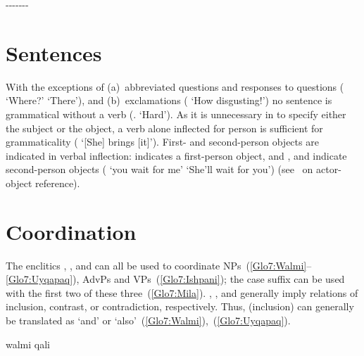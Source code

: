 \ea
\upshape 
{}-------

\z
 

\section{Sentences}\label{sec:sentence}
With the exceptions of (a)~abbreviated questions and responses to questions ( ‘Where?’  ‘There’), and (b)~exclamations ( ‘How disgusting!’) no \SYQ{} sentence is grammatical without a verb (. ‘Hard’). As it is unnecessary in \SYQ{} to specify either the subject or the object, a verb alone inflected for person is sufficient for grammaticality ( ‘[She] brings [it]’). First- and second-person objects are indicated in verbal inflection:  indicates a first-person object, and ,  and  indicate second-person objects ( ‘you wait for me’  ‘She’ll wait for you’) (see~ on actor-object reference).

\section{Coordination}\label{sec:coord}
The enclitics , , and  can all be used to coordinate NPs~(\ref{Glo7:Walmi}--\ref{Glo7:Uyqapaq}), AdvPs and VPs~(\ref{Glo7:Ishpani}); the case suffix  can be used with the first two of these three~(\ref{Glo7:Mila}). , , and  generally imply relations of inclusion, contrast, or contradiction, respectively. Thus,  (inclusion) can generally be translated as ‘and’ or ‘also’~(\ref{Glo7:Walmi}),~(\ref{Glo7:Uyqapaq}).


\bgroup
%
{walmi qali}%
{}%
{}{}%
\egroup

